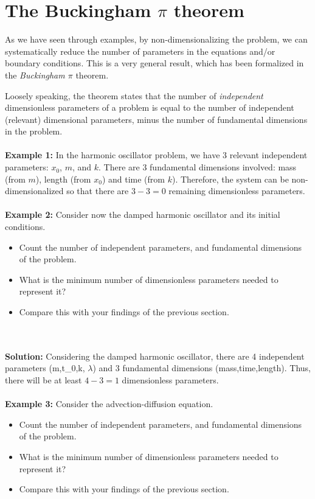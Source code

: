\section{The Buckingham $\pi$ theorem} 
  
As we have seen through examples, by non-dimensionalizing the problem, we can systematically reduce the number of parameters in the equations and/or boundary conditions. This is a very general result, which has been formalized in the {\it Buckingham $\pi$} theorem. 

Loosely speaking, the theorem states that the number of {\it independent}  dimensionless parameters of a problem is equal to the number of independent (relevant) dimensional parameters, minus the number of fundamental dimensions in the problem.   
\\
\\
{\bf Example 1:}
In the harmonic oscillator problem, we have 3 relevant independent parameters: $x_0$, $m$, and $k$. There are 3 fundamental dimensions involved: mass (from $m$), length (from $x_0$) and time (from $k$). Therefore, the system can be non-dimensionalized so that there are $3-3 = 0$ remaining dimensionless parameters. 
\\
\\
{\bf Example 2:} Consider now the damped harmonic oscillator and its initial conditions. 
\begin{itemize}
    \item Count the number of independent parameters, and fundamental dimensions of the problem. 
    \item What is the minimum number of dimensionless parameters needed to represent it?
    \item Compare this with your findings of the previous section.
\end{itemize}
\\
\\
{\color{red} {\bf Solution:}
Considering the damped harmonic oscillator, there are 4 independent parameters (m,t_0,k, $\lambda$) and 3  fundamental dimensions (mass,time,length). Thus, there will be at least $4-3=1$ dimensionless parameters.
}
\\
\\
{\bf Example 3:} Consider the advection-diffusion equation. 
\begin{itemize}
 \item Count the number of independent parameters, and fundamental dimensions of the problem. 
    \item What is the minimum number of dimensionless parameters needed to represent it?
    \item Compare this with your findings of the previous section.
\end{itemize}

